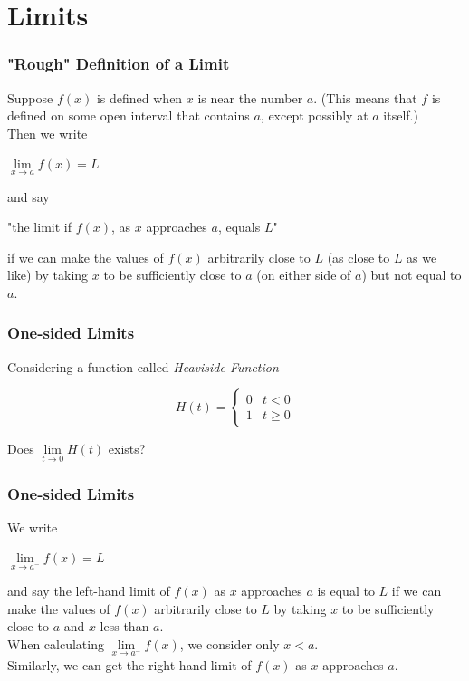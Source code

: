 \section{Limits}
    \begin{frame}
		\frametitle{"Rough" Definition of a Limit}
		Suppose $f(x)$ is defined when $x$ is near the number $a$. (This means that $f$ is defined on some open interval that contains $a$, \alert{except possibly} at $a$ itself.)\\
		Then we write
		\begin{center}
			$\lim\limits_{\textit{x} \to a}f(x) = L$
		\end{center}
		and say
		\begin{center}
			"the limit if $f(x)$, as $x$ approaches $a$, equals $L$"
		\end{center}
		if we can make the values of $f(x)$ arbitrarily close to $L$ (as close to $L$ as we like) by taking $x$ to be \alert{sufficiently close to} $a$ (on either side of $a$) but \alert{not equal to} $a$.
	\end{frame}
	\begin{frame}
		\frametitle{One-sided Limits}
		Considering a function called \textit{Heaviside Function}\\
		\begin{center}
			\begin{equation}
				H(t)=
				\begin{cases}
					0 & t<0\\
					1 & t \geq 0
				\end{cases}
			\end{equation}
		\end{center}
		Does $\lim\limits_{\textit{t} \to 0}H(t)$ exists?
	\end{frame}
	\begin{frame}
		\frametitle{One-sided Limits}
		We write
		\begin{center}
			$\lim\limits_{\textit{x} \to a^{-}}f(x) = L$
		\end{center}
		and say the left-hand limit of $f(x)$ as $x$ approaches $a$ is equal to $L$ if we can make the values of $f(x)$ arbitrarily close to $L$ by taking $x$ to be \alert{sufficiently close to} $a$ and $x$ less than $a$.\\
		\bigskip
		When calculating $\lim\limits_{\textit{x} \to a^{-}}f(x)$, we consider only $x < a$.\\
		\bigskip
		Similarly, we can get the right-hand limit of $f(x)$ as $x$ approaches $a$.
	\end{frame}
